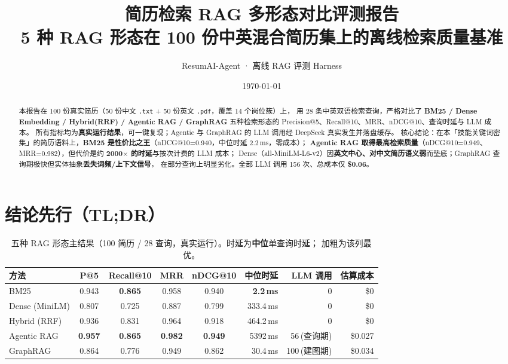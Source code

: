 \documentclass[11pt,a4paper,fontset=windows]{ctexart}
\title{\textbf{简历检索 RAG 多形态对比评测报告}\\[4pt]
\large 5 种 RAG 形态在 100 份中英混合简历集上的离线检索质量基准}
\author{ResumAI-Agent · 离线 RAG 评测 Harness}
\date{\today}
\newcommand{\best}[1]{\textbf{\textcolor{hl}{#1}}}
\begin{document}
\maketitle

\begin{abstract}
\noindent 本报告在 100 份真实简历（50 份中文 \texttt{.txt} + 50 份英文 \texttt{.pdf}，覆盖 14 个岗位簇）上，
用 28 条中英双语检索查询，严格对比了 \textbf{BM25 / Dense Embedding / Hybrid(RRF) / Agentic RAG / GraphRAG}
五种检索形态的 Precision@5、Recall@10、MRR、nDCG@10、查询时延与 LLM 成本。
所有指标均为\textbf{真实运行结果}，可一键复现；Agentic 与 GraphRAG 的 LLM 调用经 DeepSeek 真实发生并落盘缓存。
核心结论：在本「技能关键词密集」的简历语料上，\best{BM25 是性价比之王}（nDCG@10=0.940，中位时延 2.2\,ms，零成本）；
\best{Agentic RAG 取得最高检索质量}（nDCG@10=0.949、MRR=0.982），但代价是约 \best{2000$\times$ 的时延}与按次计费的 LLM 成本；
Dense（all-MiniLM-L6-v2）因\textbf{英文中心、对中文简历语义弱}而垫底；GraphRAG 查询期极快但实体抽象\textbf{丢失词频/上下文信号}，
在部分查询上明显劣化。全部 LLM 调用 156 次、总成本仅 \textbf{\$0.06}。
\end{abstract}

\tableofcontents
\vspace{6pt}

\section{结论先行（TL;DR）}
\label{sec:tldr}

\begin{table}[H]
\centering
\caption{五种 RAG 形态主结果（100 简历 / 28 查询，真实运行）。时延为\textbf{中位}单查询时延；
加粗为该列最优。}
\label{tab:main}
\small
\begin{tabular}{lccccrrr}
\toprule
方法 & P@5 & Recall@10 & MRR & nDCG@10 & 中位时延 & LLM 调用 & 估算成本 \\
\midrule
BM25            & 0.943 & \best{0.865} & 0.958 & 0.940 & \best{2.2\,ms}   & 0   & \$0 \\
Dense (MiniLM)  & 0.807 & 0.725 & 0.887 & 0.799 & 333.4\,ms & 0   & \$0 \\
Hybrid (RRF)    & 0.936 & 0.831 & 0.964 & 0.918 & 464.2\,ms & 0   & \$0 \\
Agentic RAG     & \best{0.957} & \best{0.865} & \best{0.982} & \best{0.949} & 5392\,ms & 56\,(查询期) & \$0.027 \\
GraphRAG        & 0.864 & 0.776 & 0.949 & 0.862 & 30.4\,ms  & 100\,(建图期) & \$0.034 \\
\bottomrule
\end{tabular}
\end{table}
\end{document}
